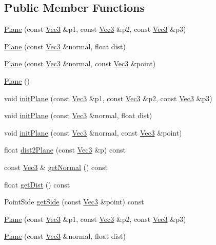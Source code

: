 \subsection*{Public Member Functions}
\begin{DoxyCompactItemize}
\item 
\hyperlink{classPlane_a85cfdb4f3357ad2ec06e2e1b469d7999}{Plane} (const \hyperlink{classVec3}{Vec3} \&p1, const \hyperlink{classVec3}{Vec3} \&p2, const \hyperlink{classVec3}{Vec3} \&p3)
\item 
\hyperlink{classPlane_a609be2a0b19f0d96d1a282357dd0005c}{Plane} (const \hyperlink{classVec3}{Vec3} \&normal, float dist)
\item 
\hyperlink{classPlane_ae7c0502b316e1b7b6cd3952681cf125d}{Plane} (const \hyperlink{classVec3}{Vec3} \&normal, const \hyperlink{classVec3}{Vec3} \&point)
\item 
\hyperlink{classPlane_a4601345e067245d9e365f57e1a020ad9}{Plane} ()
\item 
void \hyperlink{classPlane_a8a0523f909ab6a99afd5a28126355856}{init\+Plane} (const \hyperlink{classVec3}{Vec3} \&p1, const \hyperlink{classVec3}{Vec3} \&p2, const \hyperlink{classVec3}{Vec3} \&p3)
\item 
void \hyperlink{classPlane_af071cae496399c411970511639c978ef}{init\+Plane} (const \hyperlink{classVec3}{Vec3} \&normal, float dist)
\item 
void \hyperlink{classPlane_a648afe6850294d33355f7c4625fffe4f}{init\+Plane} (const \hyperlink{classVec3}{Vec3} \&normal, const \hyperlink{classVec3}{Vec3} \&point)
\item 
float \hyperlink{classPlane_a7e5bcf2d7ae8efe45753d782944a618a}{dist2\+Plane} (const \hyperlink{classVec3}{Vec3} \&p) const
\item 
const \hyperlink{classVec3}{Vec3} \& \hyperlink{classPlane_af13c988be52f6382261ecd70987a24df}{get\+Normal} () const
\item 
float \hyperlink{classPlane_a7e8852aacb0d642999c6836d949d815f}{get\+Dist} () const
\item 
Point\+Side \hyperlink{classPlane_ac28f2e1e492b6267819ad3ad38d96c5a}{get\+Side} (const \hyperlink{classVec3}{Vec3} \&point) const
\item 
\hyperlink{classPlane_a85cfdb4f3357ad2ec06e2e1b469d7999}{Plane} (const \hyperlink{classVec3}{Vec3} \&p1, const \hyperlink{classVec3}{Vec3} \&p2, const \hyperlink{classVec3}{Vec3} \&p3)
\item 
\hyperlink{classPlane_a609be2a0b19f0d96d1a282357dd0005c}{Plane} (const \hyperlink{classVec3}{Vec3} \&normal, float dist)

\end{DoxyCompactItemize}
